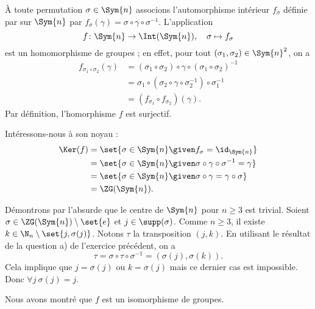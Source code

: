 À toute permutation $\sigma\in\Sym{n}$ associons l'automorphisme intérieur $f_\sigma$ définie par sur $\Sym{n}$ par $f_\sigma(\gamma) = \sigma\circ\gamma\circ\sigma^{-1}$.
L'application
\[
  f\colon\Sym{n}\to\Int(\Sym{n}), \quad \sigma\mapsto f_\sigma
\]
est un homomorphisme de groupes ; en effet, pour tout $(\sigma_1, \sigma_2)\in\Sym{n}^2$, on a
\begin{align*}
  f_{\sigma_1\circ\sigma_2}(\gamma)
    &= (\sigma_1\circ\sigma_2)\circ\gamma\circ(\sigma_1\circ\sigma_2)^{-1} \\
    &= \sigma_1\circ(\sigma_2\circ\gamma\circ\sigma_2^{-1})\circ\sigma_1^{-1} \\
    &= (f_{\sigma_1} \circ f_{\sigma_2})(\gamma).
\end{align*}
Par définition, l'homorphisme $f$ est surjectif.


Intéressons-nous à son noyau :
\begin{align*}
  \Ker(f)
    &= \set{\sigma\in\Sym{n}\given f_{\sigma} = \id_{\Sym{n}}} \\
    &= \set{\sigma\in\Sym{n}\given \sigma\circ\gamma\circ\sigma^{-1} = \gamma} \\
    &= \set{\sigma\in\Sym{n}\given \sigma\circ\gamma = \gamma\circ\sigma} \\
    & = \ZG(\Sym{n}).
\end{align*}

Démontrons par l'absurde que le centre de $\Sym{n}$ pour $n\geq 3$ est trivial.
Soient $\sigma\in\ZG(\Sym{n})\setminus\set{e}$ et $j\in\supp(\sigma)$.
Comme $n\geq 3$, il existe $k\in\N_n\setminus\set{j, \sigma(j)}$.
Notons $\tau$ la transposition $(j, k)$.
En utilisant le résultat de la question a) de l'exercice précédent, on a
\[
  \tau = \sigma\circ\tau\circ\sigma^{-1} = (\sigma(j), \sigma(k)).
\]
Cela implique que $j = \sigma(j)$ ou $k = \sigma(j)$ mais ce dernier cas est impossible. Donc $\forall j~ \sigma(j) = j$.

Nous avons montré que $f$ est un isomorphisme de groupes.
